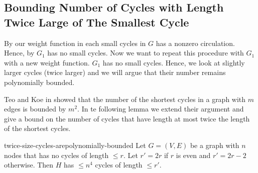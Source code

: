 \subsection{Bounding Number of Cycles with Length Twice Large of The Smallest Cycle}
By our weight function in  each small cycles in $G$ has a nonzero circulation. Hence, by  $G_1$ has no small cycles. Now we want to repeat this procedure with $G_1$ with a new weight function. $G_1$ has no small cycles. Hence, we look at slightly larger cycles (twice larger) and we will argue that their number remains polynomially bounded.

Teo and Koe in \cite{TeoKoh_1992_Tno_CONF} showed that the number of the shortest cycles in a graph with $m$ edges is bounded by $m^2$. In te following lemma we extend their argument and give a bound on the number of cycles that have length at most twice the length of the shortest cycles.
\begin{lemma}{\cite[Lemma 3.4]{FennerGurjarThierauf_2016_Bpm_CONF}}{twice-size-cycles-arepolynomially-bounded}
	Let $G=(V,E)$ be a graph with $n$ nodes that has no cycles of length $\leq r$. Let $r'=2r$ if $r$ is even and $r'=2r-2$ otherwise. Then $H$ has $\leq n^4$ cycles of length $\leq r'$.
\end{lemma}
